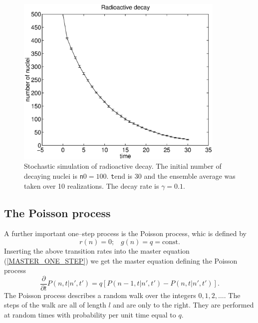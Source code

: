 \begin{figure}
\label{F_OS_DECAY}
\includegraphics[width=10cm]{./Figures/f_os_decay.eps}
\caption{Stochastic simulation of radioactive decay. The initial
  number of decaying nuclei is {\texttt n0}$= 100$. {\texttt tend}
is 30 and the ensemble average was taken over 10 realizations.
The decay rate is $\gamma=0.1$.}
\end{figure}  

\subsection{The Poisson process}
A further important one--step process is the Poisson process, whic 
is defined by
\begin{equation}
r(n) = 0; \;\;\; g(n) = q = \text{const}.
\end{equation}
Inserting the above transition rates into the master equation
(\ref{MASTER_ONE_STEP}) we get the master equation defining
the Poisson process
\begin{equation}
\label{MASTER_POISSON}
\frac{\partial}{\partial t} P(n,t|n',t') =
  q [ P(n-1,t|n',t') - P(n,t|n',t')].
\end{equation}
The Poisson process describes a random walk over the integers
$0,1,2,\ldots$. The steps of the walk are all of length $l$ and are 
only to the right. They are performed at random times with 
probability per unit time equal to $q$.

